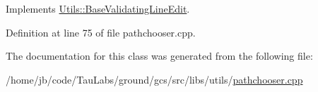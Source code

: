 \-Implements \hyperlink{class_utils_1_1_base_validating_line_edit_acaf01e0ff24a7e62f45d7a4eddb04941}{\-Utils\-::\-Base\-Validating\-Line\-Edit}.



\-Definition at line 75 of file pathchooser.\-cpp.



\-The documentation for this class was generated from the following file\-:\begin{DoxyCompactItemize}
\item 
/home/jb/code/\-Tau\-Labs/ground/gcs/src/libs/utils/\hyperlink{pathchooser_8cpp}{pathchooser.\-cpp}\end{DoxyCompactItemize}
